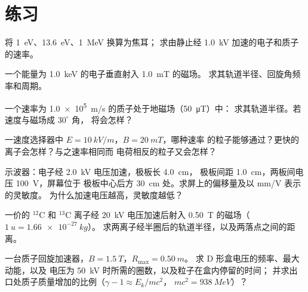 \section{练习}

\begin{exercise}[$\star$]\label{exo:b1:charged-particles:1}
将 \qty{1}{eV}、\qty{13.6}{eV}、\qty{1}{MeV} 换算为焦耳；
求由静止经 \qty{1.0}{kV} 加速的电子和质子的速率。
\end{exercise}

\begin{exercise}[$\star$]\label{exo:b1:charged-particles:2}
一个能量为 \qty{1.0}{keV} 的电子垂直射入 \qty{1.0}{mT} 的磁场。
求其轨道半径、回旋角频率和周期。
\end{exercise}

\begin{exercise}[$\star$]\label{exo:b1:charged-particles:3}
一个速率为 \qty{1.0e5}{m/s} 的质子处于地磁场（\qty{50}{\micro T}）中：
求其轨道半径。若速度与磁场成 $30^\circ$ 角，
将会怎样？
\end{exercise}

\begin{exercise}[$\star$]\label{exo:b1:charged-particles:4}
一速度选择器中 $E = \qty{10}{kV/m}$，$B = \qty{20}{mT}$，哪种速率
的粒子能够通过？更快的离子会怎样？与之速率相同而
电荷相反的粒子又会怎样？
\end{exercise}

\begin{exercise}[$\star\star$]\label{exo:b1:charged-particles:5}
示波器：电子经 \qty{2.0}{kV} 电压加速，极板长 \qty{4.0}{cm}，
极板间距 \qty{1.0}{cm}，两板间电压 \qty{100}{V}，屏幕位于
极板中心后方 \qty{30}{cm} 处。求屏上的偏移量及以 mm/V 表示的灵敏度。
为什么加速电压越高，灵敏度越低？
\end{exercise}

\begin{exercise}[$\star\star$]\label{exo:b1:charged-particles:6}
一价的 $^{12}$C 和 $^{13}$C 离子经
\qty{20}{kV} 电压加速后射入 \qty{0.50}{T} 的磁场（$\qty{1}{u} = \qty{1.66e-27}{kg}$）。
求两离子经半圈后的轨道半径，以及两落点之间的距离。
\end{exercise}

\begin{exercise}[$\star\star$]\label{exo:b1:charged-particles:7}
一台质子回旋加速器，$B = \qty{1.5}{T}$，$R_{\max} = \qty{0.50}{m}$。
求 D 形盒电压的频率、最大动能，以及
电压为 \qty{50}{kV} 时所需的圈数，以及粒子在盒内停留的时间；
并求出口处质子质量增加的比例（$\gamma - 1 \approx E_k/mc^2$，
$mc^2 = \qty{938}{MeV}$）？
\end{exercise}


